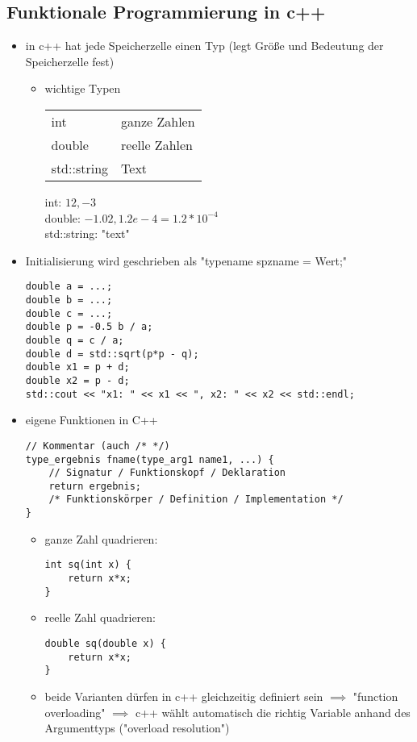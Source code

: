 \documentclass[a4paper]{scrartcl}
\theoremstyle{definition}
\theoremstyle{plain}
\theoremstyle{remark}
\theoremstyle{remark}
\begin{document}
\subsection{Funktionale Programmierung in c++}
\label{sec-6-3}
\begin{itemize}
\item in c++ hat jede Speicherzelle einen Typ (legt Größe und Bedeutung der Speicherzelle fest)
\begin{itemize}
\item wichtige Typen
\begin{center}
\begin{tabular}{ll}
int & ganze Zahlen\\
double & reelle Zahlen\\
std::string & Text\\
\end{tabular}
\end{center}
int: $12,-3$ \\
           double: $-1.02,1.2e-4 = 1.2*10^{-4}$ \\
           std::string: "text"
\end{itemize}
\item Initialisierung wird geschrieben als "typename spzname = Wert;"
\begin{verbatim}
double a = ...;
double b = ...;
double c = ...;
double p = -0.5 b / a;
double q = c / a;
double d = std::sqrt(p*p - q);
double x1 = p + d;
double x2 = p - d;
std::cout << "x1: " << x1 << ", x2: " << x2 << std::endl;
\end{verbatim}
\item eigene Funktionen in C++
\begin{verbatim}
// Kommentar (auch /* */)
type_ergebnis fname(type_arg1 name1, ...) {
	// Signatur / Funktionskopf / Deklaration
	return ergebnis;
	/* Funktionskörper / Definition / Implementation */
}
\end{verbatim}
\begin{itemize}
\item ganze Zahl quadrieren:
\begin{verbatim}
int sq(int x) {
	return x*x;
}
\end{verbatim}
\item reelle Zahl quadrieren:
\begin{verbatim}
double sq(double x) {
	return x*x;
}
\end{verbatim}
\item beide Varianten dürfen in c++ gleichzeitig definiert sein $\implies$ "function overloading" $\implies$ c++ wählt automatisch die richtig Variable anhand des Argumenttyps ("overload resolution")

\end{itemize}
\end{itemize}
\end{document}
